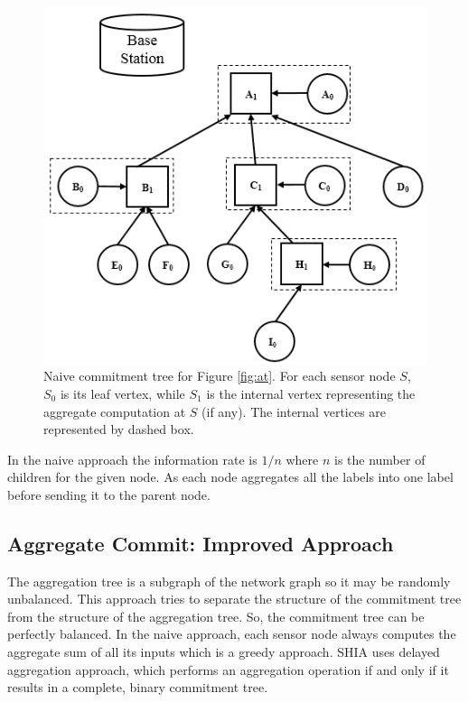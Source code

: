 		\begin{figure}[h!]
			\centering
			\includegraphics[scale = 1]{images/naive-commitment-tree.png}
			\caption{Naive commitment tree for Figure \ref{fig:at}. For each sensor node $S$, $S_{0}$ is its leaf vertex, while $S_{1}$ is the internal vertex representing the aggregate computation at $S$ (if any). The internal vertices are represented by dashed box.}
			\label{fig:naive-commitment-tree}
		\end{figure}
		In the naive approach the information rate is $1/n$ where $n$ is the number of children for the given node.
		As each node aggregates all the labels into one label before sending it to the parent node.  
	\subsection{Aggregate Commit: Improved Approach} 
		\label{sub:aggregate_commit_improved_approach}
		The aggregation tree is a subgraph of the network graph so it may be randomly unbalanced.
		This approach tries to separate the structure of the commitment tree from the structure of the aggregation tree.
		So, the commitment tree can be perfectly balanced.
		In the naive approach, each sensor node always computes the aggregate sum of all its inputs which is a greedy approach.
		SHIA uses delayed aggregation approach, which performs an aggregation operation if and only if it results in a complete, binary commitment tree.

